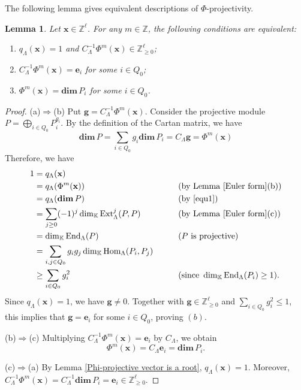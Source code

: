 \documentclass[11pt,a4paper]{amsart}
\newtheorem{lemma}[theorem]{Lemma}
\theoremstyle{definition}
\numberwithin{equation}{section}
\newcommand{\Z}{\mathbb{Z}}
\newcommand{\e}{\mathbf{e}}
\newcommand{\x}{\mathbf{x}}
\newcommand{\g}{\mathbf{g}}
\newcommand{\0}{\mathbf{0}}
\newcommand{\dimv}{\mathbf{dim}\,}
\newcommand{\Hom}{\operatorname{Hom}\nolimits}
\newcommand{\End}{\operatorname{End}\nolimits}
\newcommand{\Ext}{\operatorname{Ext}\nolimits}
\begin{document}
	The following lemma gives equivalent descriptions of $\Phi$-projectivity.
	
	\begin{lemma} \label{projectivity}
		Let $\x\in\mathbb Z^\ell$. For any $m\in\mathbb Z$, the following conditions are equivalent:
		\begin{enumerate}
			\item[(a)]  $q_\Lambda(\x)=1$ and $C_\Lambda^{-1}\Phi^m(\x)\in \Z^{\ell}_{\ge 0}$;
			\item[(b)]  $C_\Lambda^{-1}\Phi^m(\x)=\mathbf{e}_i$ for some $i\in Q_0$;
			\item[(c)] $\Phi^m(\x)=\dimv P_i$ for some  $i\in Q_0$.
		\end{enumerate}
	\end{lemma}
	
	
	
	\begin{proof}
		(a)$\Rightarrow$(b) Put
		$\g=C_\Lambda^{-1}\Phi^m(\x)$. 		
		Consider the projective module
		$
		P=\bigoplus_{i\in Q_0}P_i^{g_i}.
		$
		By the definition of the Cartan matrix, we have
		\begin{equation}\label{equ1}
			\dimv P=\sum_{i\in Q_0}g_i \dimv P_i
			=C_\Lambda \g=\Phi^m(\x)
		\end{equation}
		Therefore, we have
		\begin{alignat*}{2}
			1
			&=q_\Lambda(\x)
			&&\\
			&=q_\Lambda(\Phi^m(\x))
			&&\qquad\text{(by Lemma~\ref{Euler form}(b))}\\
			&=q_\Lambda(\dimv P)
			&&\qquad\text{(by \eqref{equ1})}\\
			&=\sum_{j\geq0}(-1)^j
			\dim_{\mathbb K}\Ext^j_\Lambda(P,P)
			&&\qquad\text{(by Lemma~\ref{Euler form}(c))}\\
			&=\dim_{\mathbb K}\End_\Lambda(P)
			&&\qquad\text{($P$ is projective)}\\
			&=\sum_{i,j\in  Q_0}
			g_i g_j\dim_{\mathbb K}\Hom_\Lambda(P_i,P_j)
			&&\\
			&\geq\sum_{i\in Q_0}g_i^2
			&&\qquad\text{(since }
			\dim_{\mathbb K}\End_\Lambda(P_i)\geq1\text{).}
		\end{alignat*}
		Since $q_\Lambda(\x)=1$, we have $\g\neq0$.
		Together with $\g\in\mathbb Z_{\geq0}^{\ell}$ and
		$\sum_{i\in Q_0}g_i^2\leq1$, this implies that
		$\g=\e_i$ for some $i\in Q_0$, proving $(b)$.
			
		(b)$\Rightarrow$(c) Multiplying $C_\Lambda^{-1}\Phi^m(\x)=\mathbf{e}_i$ by $C_\Lambda$, we obtain
		$$\Phi^m(\x)=C_\Lambda\mathbf{e}_i=\dimv P_i.$$
		
		(c)$\Rightarrow$(a) By Lemma \ref{Phi-projective vector is a root},  $q_\Lambda(\x)=1$.  Moreover, 
			$
		C_\Lambda^{-1}\Phi^m(\x)=C_\Lambda^{-1} \dimv P_i= \mathbf{e}_i\in \Z^{\ell}_{\ge 0}.
		$ 		
	\end{proof}
	
\end{document}
